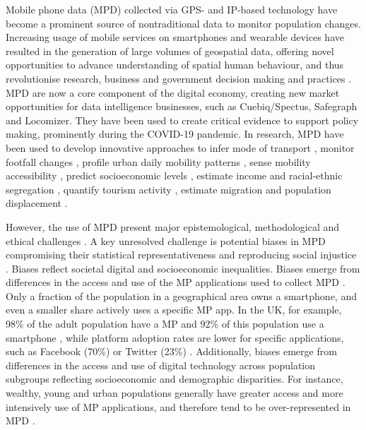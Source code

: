 \documentclass[]{rsos}%
\begin{document}
Mobile phone data (MPD) collected via GPS- and IP-based technology have
become a prominent source of nontraditional data to monitor population
changes. Increasing usage of mobile services on smartphones and wearable
devices have resulted in the generation of large volumes of geospatial
data, offering novel opportunities to advance understanding of spatial
human behaviour, and thus revolutionise research, business and
government decision making and practices \citep{rowe23-bigdata}. MPD are now
a core component of the digital economy, creating new market
opportunities for data intelligence businesses, such as Cuebiq/Spectus,
Safegraph and Locomizer. They have been used to create critical evidence
to support policy making, prominently during the COVID-19 pandemic. In
research, MPD have been used to develop innovative approaches to infer
mode of transport \citep{graells-garrido2023}, monitor footfall changes
\citep{ballantyne2022, hunter2021}, profile urban daily mobility patterns
\citep{cabrera-arnau2023, mavrogeni25, kakimoto25}, sense mobility
accessibility \citep{graells-garrido2021}, predict socioeconomic levels
\citep{soto2011, blumenstock2015}, estimate income \citep{moro2021} and
racial-ethnic segregation \citep{Xu2024}, quantify tourism activity
\citep{raun2016}, estimate migration \citep{cepal24, gonzález-leonardo2025} and
population displacement \citep{rowe2022, iradukunda2025, cabrera25}.

However, the use of MPD present major epistemological, methodological
and ethical challenges \citep{rowe23-bigdata}. A key unresolved challenge is
potential biases in MPD compromising their statistical
representativeness and reproducing social injustice
\citep{wesolowski13-biases}. Biases reflect societal digital and
socioeconomic inequalities. Biases emerge from differences in the access
and use of the MP applications used to collect MPD \citep{porter2012, wesolowski13-biases}. Only a fraction of the population in a
geographical area owns a smartphone, and even a smaller share actively
uses a specific MP app. In the UK, for example, 98\% of the adult
population have a MP and 92\% of this population use a smartphone
\citep{ofcom23}, while platform adoption rates are lower for specific
applications, such as Facebook (70\%) or Twitter (23\%) \citep{statista24}.
Additionally, biases emerge from differences in the access and use of
digital technology across population subgroups reflecting socioeconomic
and demographic disparities. For instance, wealthy, young and urban
populations generally have greater access and more intensively use of MP
applications, and therefore tend to be over-represented in MPD
\citep{blumenstock2010, wesolowski13-biases, schlosser21-biases}.
\end{document}
